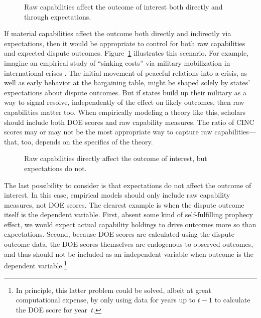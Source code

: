 \begin{figure}[htp]
  \centering
  
  \caption{
    Raw capabilities affect the outcome of interest both directly and through expectations.
  }
  \label{fig:dag-cap1-doe1}
\end{figure}

If material capabilities affect the outcome both directly and indirectly via expectations, then it would be appropriate to control for both raw capabilities and expected dispute outcomes.
Figure~\ref{fig:dag-cap1-doe1} illustrates this scenario.
For example, imagine an empirical study of ``sinking costs'' via military mobilization in international crises \citep{fearon_signaling_1997}.
The initial movement of peaceful relations into a crisis, as well as early behavior at the bargaining table, might be shaped solely by states' expectations about dispute outcomes.
But if states build up their military as a way to signal resolve, independently of the effect on likely outcomes, then raw capabilities matter too.
When empirically modeling a theory like this, scholars should include both DOE scores and raw capability measures.
The ratio of CINC scores may or may not be the most appropriate way to capture raw capabilities---that, too, depends on the specifics of the theory.

\begin{figure}[htp]
  \centering
  
  \caption{
    Raw capabilities directly affect the outcome of interest, but expectations do not.
  }
  \label{fig:dag-cap1-doe0}
\end{figure}

The last possibility to consider is that expectations do not affect the outcome of interest.
In this case, empirical models should only include raw capability measures, not DOE scores.
The clearest example is when the dispute outcome itself is the dependent variable.
First, absent some kind of self-fulfilling prophecy effect, we would expect actual capability holdings to drive outcomes more so than expectations.
Second, because DOE scores are calculated using the dispute outcome data, the DOE scores themselves are endogenous to observed outcomes, and thus should not be included as an independent variable when outcome is the dependent variable.\footnote{
  In principle, this latter problem could be solved, albeit at great computational expense, by only using data for years up to $t-1$ to calculate the DOE score for year~$t$.
}

